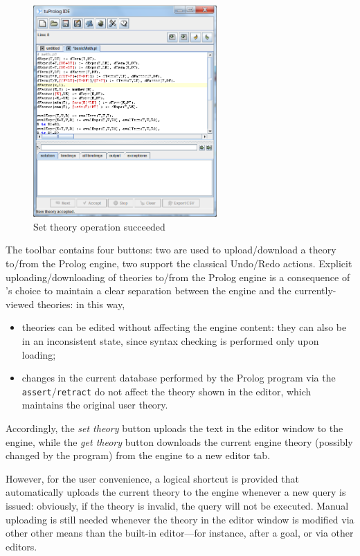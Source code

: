 \begin{figure}
\centering
\includegraphics[width=7cm]{images/setTheorySucceeded}
\caption{Set theory operation succeeded}
\label{fig:set-theory-succeeded}
\end{figure}

The toolbar contains four buttons: two are used to upload/download a theory to/from the Prolog engine, two support the classical Undo/Redo actions.
%
Explicit uploading/downloading of theories to/from the Prolog engine is a consequence of \tuprolog{}'s choice to maintain a clear separation between the engine and the currently-viewed theories: in this way,
\begin{itemize}
  \item theories can be edited without affecting the engine content: they can also be in an inconsistent state, since syntax checking is performed only upon loading;
  \item changes in the current database performed by the Prolog program via the \texttt{assert}/\texttt{retract} do not affect the theory shown in the editor, which maintains the original user theory.
\end{itemize}
%
Accordingly, the \textit{set theory} button uploads the text in the editor window to the engine, while the \textit{get theory} button downloads the current engine theory (possibly changed by the program) from the engine to a new editor tab.

However, for the user convenience, a logical shortcut is provided that automatically uploads the current theory to the engine whenever a new query is issued: obviously, if the theory is invalid, the query will not be executed.
%
Manual uploading is still needed whenever the theory in the editor window is modified via other other means than the built-in editor---for instance, after a  goal, or via other editors.

